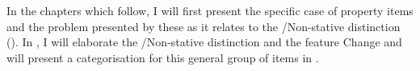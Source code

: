 In the chapters which follow, I will first present the specific case
of property items and the problem presented by these as it relates to
the \slash Non-stative distinction ().  In ,
I will elaborate the \slash Non-stative distinction and the feature
Change and will present a categorisation for this general group of
items in .
